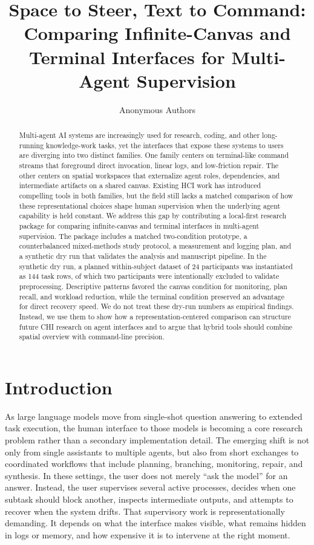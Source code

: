 \documentclass[sigconf]{acmart}
\title{Space to Steer, Text to Command: Comparing Infinite-Canvas and Terminal Interfaces for Multi-Agent Supervision}
\author{Anonymous Authors}
\affiliation{%
  \institution{Anonymous Institution}
  \city{Anonymous City}
  \country{Anonymous Country}
}
\begin{document}
\begin{abstract}
Multi-agent AI systems are increasingly used for research, coding, and other long-running knowledge-work tasks, yet the interfaces that expose these systems to users are diverging into two distinct families. One family centers on terminal-like command streams that foreground direct invocation, linear logs, and low-friction repair. The other centers on spatial workspaces that externalize agent roles, dependencies, and intermediate artifacts on a shared canvas. Existing HCI work has introduced compelling tools in both families, but the field still lacks a matched comparison of how these representational choices shape human supervision when the underlying agent capability is held constant. We address this gap by contributing a local-first research package for comparing infinite-canvas and terminal interfaces in multi-agent supervision. The package includes a matched two-condition prototype, a counterbalanced mixed-methods study protocol, a measurement and logging plan, and a synthetic dry run that validates the analysis and manuscript pipeline. In the synthetic dry run, a planned within-subject dataset of 24 participants was instantiated as 144 task rows, of which two participants were intentionally excluded to validate preprocessing. Descriptive patterns favored the canvas condition for monitoring, plan recall, and workload reduction, while the terminal condition preserved an advantage for direct recovery speed. We do not treat these dry-run numbers as empirical findings. Instead, we use them to show how a representation-centered comparison can structure future CHI research on agent interfaces and to argue that hybrid tools should combine spatial overview with command-line precision.
\end{abstract}

\maketitle

\section{Introduction}
As large language models move from single-shot question answering to extended task execution, the human interface to those models is becoming a core research problem rather than a secondary implementation detail. The emerging shift is not only from single assistants to multiple agents, but also from short exchanges to coordinated workflows that include planning, branching, monitoring, repair, and synthesis. In these settings, the user does not merely ``ask the model'' for an answer. Instead, the user supervises several active processes, decides when one subtask should block another, inspects intermediate outputs, and attempts to recover when the system drifts. That supervisory work is representationally demanding. It depends on what the interface makes visible, what remains hidden in logs or memory, and how expensive it is to intervene at the right moment.
\end{document}
